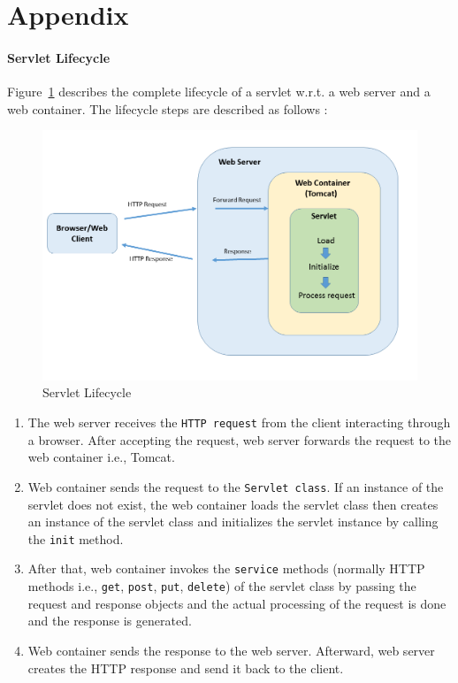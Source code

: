 \section{Appendix}\label{sec:Appendix}

\paragraph{Servlet Lifecycle}
Figure~\ref{fig:Server_Servlet} describes the complete lifecycle of a servlet w.r.t. a web server and a web container. The lifecycle steps are described as follows \cite{servlet}:

\begin{figure}[h]
	\centering
	\includegraphics[width=1\textwidth]{figures/Server_Servlet}
	\caption{Servlet Lifecycle}
	\label{fig:Server_Servlet}
\end{figure}

\begin{enumerate}
	\item {The web server receives the \texttt{HTTP request} from the client interacting through a browser. After accepting the request, web server forwards the request to the web container i.e., Tomcat.}
	\item {Web container sends the request to the \texttt{Servlet class}. If an instance of the servlet does not exist, the web container loads the servlet class then creates an instance of the servlet class and initializes the servlet instance by calling the \texttt{init} method.}
	\item {After that, web container invokes the \texttt{service} methods (normally HTTP methods i.e., \texttt{get}, \texttt{post}, \texttt{put}, \texttt{delete}) of the servlet class by passing the request and response objects and the actual processing of the request is done and the response is generated.}
	\item {Web container sends the response to the web server. Afterward, web server creates the HTTP response and send it back to the client.}
\end{enumerate}

